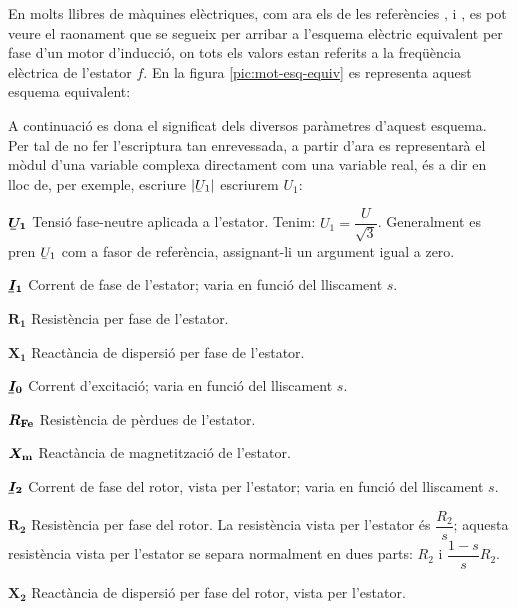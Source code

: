 En molts llibres de màquines elèctriques, com ara els de les referències \cite{CHA}, \cite{FIT} i \cite{JFM}, es pot veure el raonament que se segueix per arribar a l'esquema elèctric equivalent per fase d'un motor d'inducció, on tots els valors estan referits a la freqüència elèctrica de l'estator $f$. En la figura \vref{pic:mot-esq-equiv} es representa aquest esquema equivalent:

\begin{center}
    
    \label{pic:mot-esq-equiv}
\end{center}

A continuació es dona el significat dels diversos paràmetres d'aquest esquema. Per tal de no fer l'escriptura tan enrevessada, a partir d'ara es representarà el mòdul d'una variable complexa  directament com una variable real, és a dir en lloc de, per exemple, escriure $|\cmplx{U}_1|$ escriurem $U_1$:

\begin{list}{}
   {\setlength{\labelwidth}{12mm} \setlength{\leftmargin}{12mm} \setlength{\labelsep}{2mm}}
   \item[$\boldsymbol{\cmplx{U}_1}$] Tensió fase-neutre aplicada a l'estator. Tenim: $U_1 = \dfrac{U}{\sqrt{3}}$. Generalment   es pren $\cmplx{U}_1$ com a fasor de referència, assignant-li un argument igual a zero.
   \item[$\boldsymbol{\cmplx{I}_1}$] Corrent de fase de l'estator; varia en funció del lliscament $s$.
   \item[$\boldsymbol{R_1}$] Resistència per fase de l'estator.
   \item[$\boldsymbol{X_1}$] Reactància de dispersió per fase de l'estator.
   \item[$\boldsymbol{\cmplx{I}_0}$] Corrent d'excitació; varia en funció del lliscament $s$.
   \item[$\boldsymbol{R_\mathrm{Fe}}$] Resistència de pèrdues de l'estator.
   \item[$\boldsymbol{X_\mathrm{m}}$] Reactància de magnetització de l'estator.
   \item[$\boldsymbol{\cmplx{I}_2}$] Corrent de fase del rotor, vista per l'estator; varia en funció del lliscament $s$.
   \item[$\boldsymbol{R_2}$] Resistència per fase del rotor. La resistència vista per l'estator és $\dfrac{R_2}{s}$; aquesta resistència vista per l'estator se separa normalment en dues parts: $R_2$ i $\dfrac{1-s}{s} R_2$.
   \item[$\boldsymbol{X_2}$] Reactància de dispersió per fase del rotor, vista per l'estator.
\end{list}


